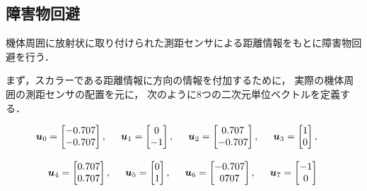 \subsection{障害物回避}
  機体周囲に放射状に取り付けられた測距センサによる距離情報をもとに障害物回避を行う．

  まず，スカラーである距離情報に方向の情報を付加するために，
  実際の機体周囲の測距センサの配置を元に，
  次のように8つの二次元単位ベクトルを定義する．

  \begin{eqnarray}
    \bm{u}_0 = \begin{bmatrix} -0.707 \\ -0.707 \end{bmatrix}, \hspace{5mm} \nonumber
    \bm{u}_1 = \begin{bmatrix}  0     \\ -1     \end{bmatrix}, \hspace{5mm}
    \bm{u}_2 = \begin{bmatrix}  0.707 \\ -0.707 \end{bmatrix}, \hspace{5mm}
    \bm{u}_3 = \begin{bmatrix}  1     \\  0     \end{bmatrix}, \hspace{5mm} \\[3mm]
    \bm{u}_4 = \begin{bmatrix}  0.707 \\  0.707 \end{bmatrix}, \hspace{5mm} \nonumber
    \bm{u}_5 = \begin{bmatrix}  0     \\  1     \end{bmatrix}, \hspace{5mm}
    \bm{u}_6 = \begin{bmatrix} -0.707 \\  0707  \end{bmatrix}, \hspace{5mm}
    \bm{u}_7 = \begin{bmatrix} -1     \\  0     \end{bmatrix}  \hspace{5mm} \\ \nonumber
  \end{eqnarray}

